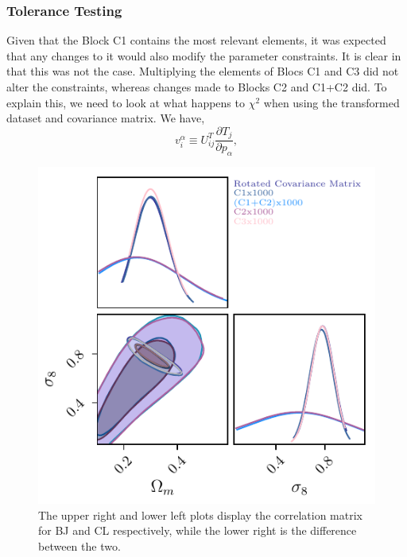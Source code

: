 \documentclass[twocolumn]{\docclass}
\newcommand\be{\begin{equation}}
\newcommand\ee{\end{equation}}
\begin{document}
	
	\subsubsection{Tolerance Testing}
	
	Given that the Block C1 contains the most relevant elements, it was expected that any changes to it would also modify the parameter constraints. It is clear in 	 that this was not the case. Multiplying the elements of Blocs C1 and C3 did not alter the constraints, whereas changes made to Blocks C2 and C1+C2 did. To explain this, we need to look at what happens to $\chi^2$ when using the transformed dataset and covariance matrix. We have,
		\be
	v_i^\alpha \equiv U_{ij}^T \frac{\partial T_j}{\partial p_\alpha}
	,\ee
	
	
	
	\begin{figure}
		\includegraphics[width=0.9\columnwidth]{Multiply_error.pdf}
		\caption{The upper right and lower left plots display the correlation matrix for BJ and CL respectively, while the lower right is the difference between the two. \label{fig:tolerance1000}}
	\end{figure}
	
	
	
	
	
\end{document}

